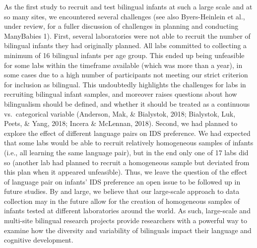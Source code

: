 \documentclass[english,,man,floatsintext]{apa6}
\begin{document}
As the first study to recruit and test bilingual infants at such a large scale and at so many sites, we encountered several challenges (see also Byers-Heinlein et al., under review, for a fuller discussion of challenges in planning and conducting ManyBabies 1). First, several laboratories were not able to recruit the number of bilingual infants they had originally planned. All labs committed to collecting a minimum of 16 bilingual infants per age group. This ended up being unfeasible for some labs within the timeframe available (which was more than a year), in some cases due to a high number of participants not meeting our strict criterion for inclusion as bilingual. This undoubtedly highlights the challenges for labs in recruiting bilingual infant samples, and moreover raises questions about how bilingualism should be defined, and whether it should be treated as a continuous vs.~categorical variable (Anderson, Mak, \& Bialystok, 2018; Bialystok, Luk, Peets, \& Yang, 2018; Incera \& McLennan, 2018). Second, we had planned to explore the effect of different language pairs on IDS preference. We had expected that some labs would be able to recruit relatively homogeneous samples of infants (i.e., all learning the same language pair), but in the end only one of 17 labs did so (another lab had planned to recruit a homogeneous sample but deviated from this plan when it appeared unfeasible). Thus, we leave the question of the effect of language pair on infants' IDS preference an open issue to be followed up in future studies. By and large, we believe that our large-scale approach to data collection may in the future allow for the creation of homogeneous samples of infants tested at different laboratories around the world. As such, large-scale and multi-site bilingual research projects provide researchers with a powerful way to examine how the diversity and variability of bilinguals impact their language and cognitive development.
\end{document}
